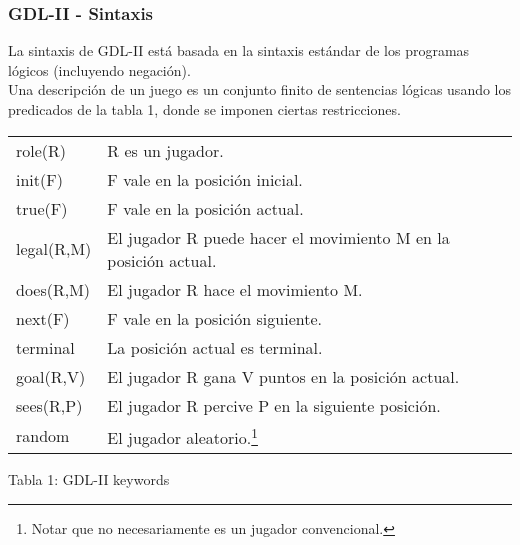 \documentclass{beamer}
\begin{document}
\begin{frame}
\frametitle{GDL-II - Sintaxis}

La sintaxis de GDL-II está basada en la sintaxis estándar de los programas lógicos (incluyendo negación).\\
Una descripción de un juego es un conjunto finito de sentencias lógicas usando los predicados de la tabla 1, donde se imponen ciertas restricciones. 

\begin{center}
\begin{table}\scriptsize
\begin{tabular}{|l|l|}
\hline
role(R) & R es un jugador. \\
init(F) & F vale en la posición inicial. \\ \hline
true(F) & F vale en la posición actual. \\ 
legal(R,M) & El jugador R puede hacer el movimiento M en la posición actual. \\ 
does(R,M) & El jugador R hace el movimiento M. \\ 
next(F) & F vale en la posición siguiente. \\ \hline
terminal & La posición actual es terminal. \\
goal(R,V) & El jugador R gana V puntos en la posición actual. \\ \hline \hline
sees(R,P) & El jugador R percive P en la siguiente posición. \\
random &  El jugador aleatorio.\footnote{Notar que no necesariamente es un jugador convencional.} \\ \hline
\end{tabular}
\label{tabla:sencilla}
\end{table}
\end{center}

\vspace{-20pt}

\begin{center}
\scriptsize Tabla 1: GDL-II keywords
\end{center}

\end{frame}
\end{document}
